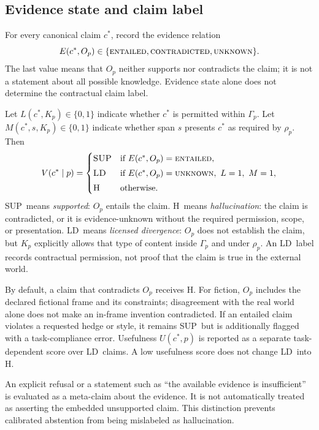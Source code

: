 \documentclass{clv2025}
\newcommand{\LD}{\textsc{LD}}
\newcommand{\Hall}{\textsc{H}}
\newcommand{\SUP}{\textsc{SUP}}
\begin{document}
\subsection{Evidence state and claim label}

For every canonical claim $c^*$, record the evidence relation
\[
E(c^*,O_p)\in\{\textsc{entailed},\textsc{contradicted},\textsc{unknown}\}.
\]
The last value means that $O_p$ neither supports nor contradicts the claim; it is not a statement about all possible knowledge.
Evidence state alone does not determine the contractual claim label.

Let $L(c^*,K_p)\in\{0,1\}$ indicate whether $c^*$ is permitted within $\Gamma_p$.
Let $M(c^*,s,K_p)\in\{0,1\}$ indicate whether span $s$ presents $c^*$ as required by $\rho_p$.
Then
\[
V(c^*\mid p)=
\begin{cases}
\SUP & \text{if }E(c^*,O_p)=\textsc{entailed},\\[1mm]
\LD & \text{if }E(c^*,O_p)=\textsc{unknown},\ L=1,\ M=1,\\[1mm]
\Hall & \text{otherwise.}
\end{cases}
\]
\SUP\ means \emph{supported}: $O_p$ entails the claim.
\Hall\ means \emph{hallucination}: the claim is contradicted, or it is evidence-unknown without the required permission, scope, or presentation.
\LD\ means \emph{licensed divergence}: $O_p$ does not establish the claim, but $K_p$ explicitly allows that type of content inside $\Gamma_p$ and under $\rho_p$.
An \LD\ label records contractual permission, not proof that the claim is true in the external world.

By default, a claim that contradicts $O_p$ receives \Hall.
For fiction, $O_p$ includes the declared fictional frame and its constraints; disagreement with the real world alone does not make an in-frame invention contradicted.
If an entailed claim violates a requested hedge or style, it remains \SUP\ but is additionally flagged with a task-compliance error.
Usefulness $U(c^*,p)$ is reported as a separate task-dependent score over \LD\ claims.
A low usefulness score does not change \LD\ into \Hall.

An explicit refusal or a statement such as ``the available evidence is insufficient'' is evaluated as a meta-claim about the evidence.
It is not automatically treated as asserting the embedded unsupported claim.
This distinction prevents calibrated abstention from being mislabeled as hallucination.
\end{document}
